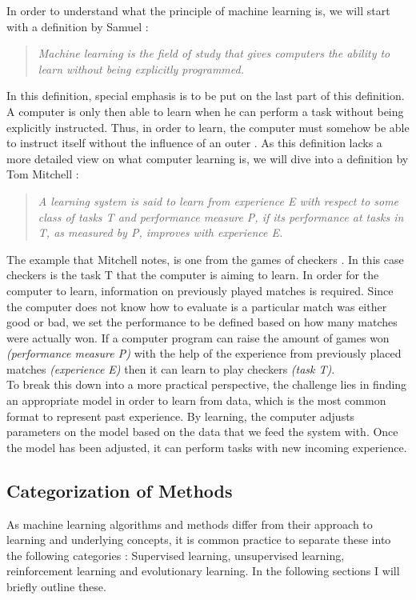 In order to understand what the principle of machine learning is, we will start with a definition by Samuel \cite{samuel2000some}:\\
\begin{quote}
\textit{Machine learning is the field of study that gives computers the ability to learn without being explicitly programmed.}\\
\end{quote}

In this definition, special emphasis is to be put on the last part of this definition. A computer is only then able to learn when he can perform a task without being explicitly instructed. Thus, in order to learn, the computer must somehow be able to instruct itself without the influence of an outer . As this definition lacks a more detailed view on what computer learning is, we will dive into a definition by Tom Mitchell \cite{mitchell2006discipline}:\\
\begin{quote}
\textit{A learning system is said to learn from experience E with respect to some class of tasks T and performance measure P, if its performance at tasks in T, as measured by P, improves with experience E.}\\
\end{quote}

The example that Mitchell notes, is one from the games of checkers \cite{mitchell2006discipline}. In this case checkers is the task T that the computer is aiming to learn. In order for the computer to learn, information on previously played matches is required. Since the computer does not know how to evaluate is a particular match was either good or bad, we set the performance to be defined based on how many matches were actually won. If a computer program can raise the amount of games won \textit{(performance measure P)} with the help of the experience from previously placed matches \textit{(experience E)} then it can learn to play checkers \textit{(task T)}. \\

To break this down into a more practical perspective, the challenge lies in finding an appropriate model in order to learn from data, which is the most common format to represent past experience. By learning, the computer adjusts parameters on the model based on the data that we feed the system with. Once the model has been adjusted, it can perform tasks with new incoming experience.

\subsection{Categorization of Methods}
As machine learning algorithms and methods differ from their approach to learning and underlying concepts, it is common practice to separate these into the following categories \cite{Duda:2000:PC:954544, Marsland:2009:MLA:1571643}  : Supervised learning, unsupervised learning, reinforcement learning and evolutionary learning. In the following sections I will briefly outline these.\\

